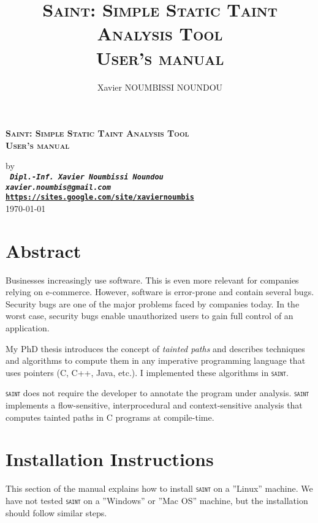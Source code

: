 \documentclass[12pt,onecolumn,a4paper]{article}
\newcommand{\saint}{\texttt{\textsc{saint}}\xspace}
\begin{document}
\pagestyle{empty}

\title{\textsc{Saint: Simple Static Taint Analysis Tool\\
				User's manual}}
\author{Xavier NOUMBISSI NOUNDOU}

\begin{center}
\begin{LARGE}
\textbf{ \textsc{Saint: Simple Static Taint Analysis Tool\\
				User's manual}}\\
\end{LARGE}
\begin{large}
\vspace{0.3cm}
by\\
\vspace{0.3cm}
\texttt{ \bf \textit{Dipl.-Inf. Xavier Noumbissi Noundou\\
xavier.noumbis@gmail.com}\\
\url{https://sites.google.com/site/xaviernoumbis}}\\
\vspace{0.3cm}
\today{}\\
\vspace{1.3cm}
\end{large}
\end{center}

\tableofcontents

\section{Abstract}
Businesses increasingly use software. This is even more
relevant for companies relying on e-commerce. However,
software is error-prone and contain several bugs. Security
bugs are one of the major problems faced by companies today.
In the worst case, security bugs enable unauthorized users
to gain full control of an application.

My PhD thesis introduces the concept of 
\textcolor{firebrickred}{\textit{tainted paths}} and
describes techniques and algorithms to compute them in
any imperative programming language that uses
pointers (C, C++, Java, etc.). I implemented these
algorithms in \saint.

\saint does not require the developer to annotate
the program under analysis. \saint implements a
flow-sensitive, interprocedural and context-sensitive
analysis that computes tainted paths in C programs
at compile-time.

\section{Installation Instructions}
This section of the manual explains how to install \saint
on a ''Linux'' machine. We have not tested \saint on a ''Windows''
or ''Mac OS'' machine, but the installation should follow similar steps. 
\end{document}
